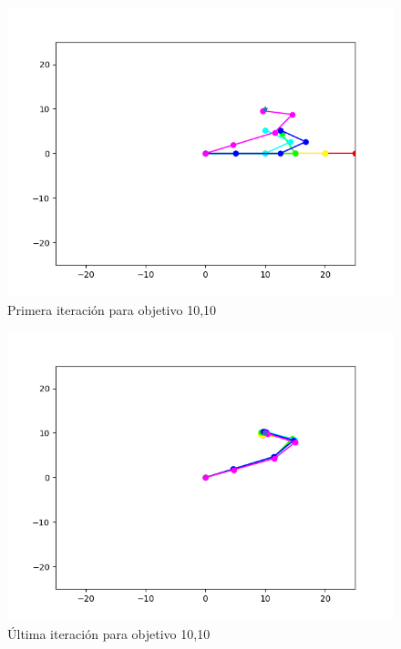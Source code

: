 \begin{figure}[htb]
   \centering
   \includegraphics[width=.8\linewidth]{images/ccd_5.png}
   \caption{Primera iteración para objetivo 10,10}
   \label{chapter:ccd_ejemplo1}
\end{figure}
\begin{figure}[htb]
   \centering
   \includegraphics[width=.8\linewidth]{images/ccd_6.png}
   \caption{Última iteración para objetivo 10,10}
   \label{chapter:ccd_ejemplo2}
\end{figure}

